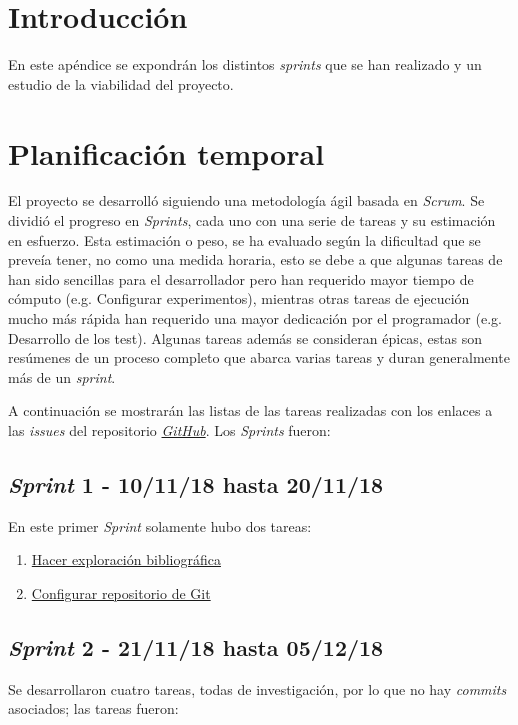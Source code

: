 
\section{Introducción}

En este apéndice se expondrán los distintos \textit{sprints} que se han realizado y un estudio de la viabilidad del proyecto.

\section{Planificación temporal}

El proyecto se desarrolló siguiendo una metodología ágil basada en \textit{Scrum}. Se dividió el progreso en \textit{Sprints}, cada uno con una serie de tareas y su estimación en esfuerzo. Esta estimación o peso, se ha evaluado según la dificultad que se preveía tener, no como una medida horaria, esto se debe a que algunas tareas de han sido sencillas para el desarrollador pero han requerido mayor tiempo de cómputo (e.g. Configurar experimentos), mientras otras tareas de ejecución mucho más rápida han requerido una mayor dedicación por el programador (e.g. Desarrollo de los test). Algunas tareas además se consideran épicas, estas son resúmenes de un proceso completo que abarca varias tareas y duran generalmente más de un \textit{sprint}. 

A continuación se mostrarán las listas de las tareas realizadas con los enlaces a las \textit{issues} del repositorio \textit{\href{https://github.com/jlgarridol/TFG-SmartBeds}{GitHub}}. Los \textit{Sprints} fueron:
\subsection{\textit{Sprint} 1 - 10/11/18 hasta 20/11/18}
En este primer \textit{Sprint} solamente hubo dos tareas:
\begin{enumerate}
	\item \href{https://github.com/joselucross/TFG-SmartBeds/issues/1}{Hacer exploración bibliográfica}
	\item \href{https://github.com/joselucross/TFG-SmartBeds/issues/2}{Configurar repositorio de Git}
\end{enumerate}
\subsection{\textit{Sprint} 2 - 21/11/18 hasta 05/12/18}
Se desarrollaron cuatro tareas, todas de investigación, por lo que no hay \textit{commits} asociados; las tareas fueron:

